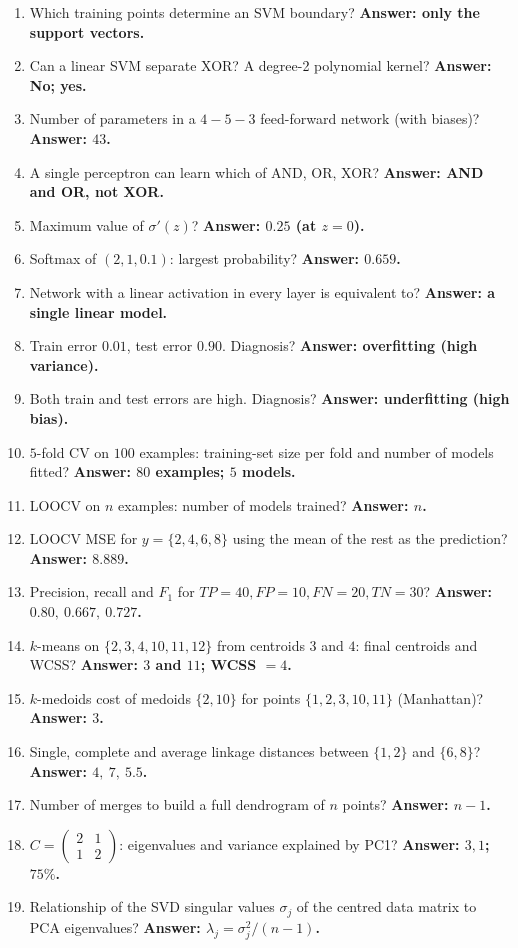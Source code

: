 \documentclass[11pt,a4paper]{article}
\begin{document}
\begin{enumerate}[leftmargin=*,itemsep=4pt]
\item Which training points determine an SVM boundary? \textbf{Answer: only the support vectors.}
\item Can a linear SVM separate XOR? A degree-2 polynomial kernel? \textbf{Answer: No; yes.}
\item Number of parameters in a $4\!-\!5\!-\!3$ feed-forward network (with biases)? \textbf{Answer: $43$.}
\item A single perceptron can learn which of AND, OR, XOR? \textbf{Answer: AND and OR, not XOR.}
\item Maximum value of $\sigma'(z)$? \textbf{Answer: $0.25$ (at $z=0$).}
\item Softmax of $(2,1,0.1)$: largest probability? \textbf{Answer: $0.659$.}
\item Network with a linear activation in every layer is equivalent to? \textbf{Answer: a single linear model.}
\item Train error $0.01$, test error $0.90$. Diagnosis? \textbf{Answer: overfitting (high variance).}
\item Both train and test errors are high. Diagnosis? \textbf{Answer: underfitting (high bias).}
\item $5$-fold CV on $100$ examples: training-set size per fold and number of models fitted? \textbf{Answer: $80$ examples; $5$ models.}
\item LOOCV on $n$ examples: number of models trained? \textbf{Answer: $n$.}
\item LOOCV MSE for $y=\{2,4,6,8\}$ using the mean of the rest as the prediction? \textbf{Answer: $8.889$.}
\item Precision, recall and $F_1$ for $TP=40,FP=10,FN=20,TN=30$? \textbf{Answer: $0.80,\ 0.667,\ 0.727$.}
\item $k$-means on $\{2,3,4,10,11,12\}$ from centroids $3$ and $4$: final centroids and WCSS? \textbf{Answer: $3$ and $11$; WCSS $=4$.}
\item $k$-medoids cost of medoids $\{2,10\}$ for points $\{1,2,3,10,11\}$ (Manhattan)? \textbf{Answer: $3$.}
\item Single, complete and average linkage distances between $\{1,2\}$ and $\{6,8\}$? \textbf{Answer: $4,\ 7,\ 5.5$.}
\item Number of merges to build a full dendrogram of $n$ points? \textbf{Answer: $n-1$.}
\item $C=\begin{pmatrix}2&1\\1&2\end{pmatrix}$: eigenvalues and variance explained by PC1? \textbf{Answer: $3,1$; $75\%$.}
\item Relationship of the SVD singular values $\sigma_j$ of the centred data matrix to PCA eigenvalues? \textbf{Answer: $\lambda_j=\sigma_j^2/(n-1)$.}
\end{enumerate}
\end{document}
